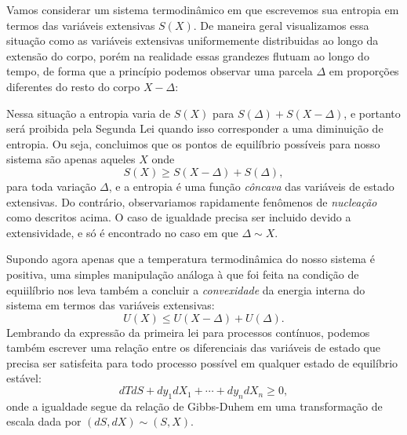 Vamos considerar um sistema termodinâmico em que escrevemos sua entropia em
termos das variáveis extensivas $S(X)$. De maneira geral visualizamos essa
situação como as variáveis extensivas uniformemente distribuidas ao longo da
extensão do corpo, porém na realidade essas grandezes flutuam ao longo do tempo,
de forma que a princípio podemos observar uma parcela $\Delta$ em proporções
diferentes do resto do corpo $X-\Delta$:
\begin{figure}[H]
    \centering
\end{figure}
Nessa situação a entropia varia de $S(X)$ para $S(\Delta)+S(X-\Delta)$, e
portanto será proibida pela Segunda Lei quando isso corresponder a uma
diminuição de entropia. Ou seja, concluimos que os pontos de equilíbrio
possíveis para nosso sistema são apenas aqueles $X$ onde
$$S(X)\geq S(X-\Delta)+S(\Delta),$$
para toda variação $\Delta$, e a entropia é uma função \emph{côncava} das
variáveis de estado extensivas. Do contrário, observariamos rapidamente
fenômenos de \emph{nucleação} como descritos acima. O caso de igualdade precisa
ser incluido devido a extensividade, e só é encontrado no caso em que $\Delta
\sim X$.

Supondo agora apenas que a temperatura termodinâmica do nosso sistema é
positiva, uma simples manipulação análoga à que foi feita na condição de
equiilíbrio nos leva também a concluir a \emph{convexidade} da energia interna
do sistema em termos das variáveis extensivas:
$$U(X)\leq U(X-\Delta)+U(\Delta).$$
Lembrando da expressão da primeira lei para processos contínuos, podemos também
escrever uma relação entre os diferenciais das variáveis de estado que precisa
ser satisfeita para todo processo possível em qualquer estado de equilíbrio
estável:
$$dTdS+dy_1dX_1+\cdots+dy_ndX_n\geq0,$$
onde a igualdade segue da relação de Gibbs-Duhem em uma transformação de escala
dada por $(dS,dX)\sim(S,X)$.


